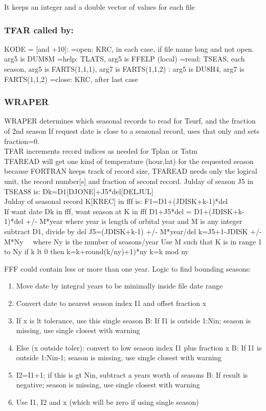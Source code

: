 It keeps an integer and a double vector of values for each file 

\subsubsection{TFAR called by:} %

KODE = [and +10]:
=open: KRC, in each case, if file name long and not open. arg5 is DUM8M
=help: TLATS, arg5 is FFELP (local)
=read: TSEAS, each season, arg5 is  FARTS(1,1,1), arg7 is  FARTS(1,1,2)
: arg5 is DU8H4, arg7 is  FARTS(1,1,2)
=close: KRC, after last case

\subsubsection{WRAPER}

WRAPER determines which seasonal records to read for Tsurf, and the fraction of 2nd season
\qi If request date is close to a seasonal record, uses that only and sets fraction=0.
\\ TFAR increments record indices as needed for Tplan or Tatm
\\ TFAREAD will get one kind of temperature (hour,lat) for the requested season 
\qi because FORTRAN keeps track of record size, TFAREAD needs only the logical unit, the record number[s] and fraction of second record.
Julday of season J5 in TSEAS8 is: Dk=D1[DJONE]+J5*del[DELJUL]
\\ Julday of seasonal record  K[KREC] in fff is: F1=D1+(JDISK+k-1)*del 
\\ If want date Dk in fff,  want season at K in fff
D1+J5*del = D1+(JDISK+k-1)*del +/-  M*year
\qi where year is length of orbital year and M is any integer 
\qiii subtract D1, divide by del
\qi J5=(JDISK+k-1)    +/-  M*year/del
\qi k=J5+1-JDISK +/-  M*Ny \ \  where Ny is the number of seasons/year 
\qii Use M such that K is in range 1 to Ny
\qiii if k lt 0 then k=k+round(k/ny)+1)*ny
\qiii k=k mod ny 

FFF could contain less or more than one year. Logic to find bounding seasons:
\begin{enumerate} 
\item Move date by integral years to be minimally inside file date range
\item Convert date to nearest season index I1 and offset fraction x
\item If x  is lt tolerance, use this single season
\qi B: If I1 is outside 1:Nin; season is missing, use single closest with warning
\item Else (x outside toler): convert to low season index I1 plus fraction x
\qi B: If I1 is outside 1:Nin-1; season is missing, use single closest with warning
\item I2=I1+1; if this is gt Nin, subtract a years worth of seasons
\qi B:  If result is negative; season is missing, use single closest with warning
\item  Use I1, I2 and x (which will be zero if using single season)
 \end{enumerate}

